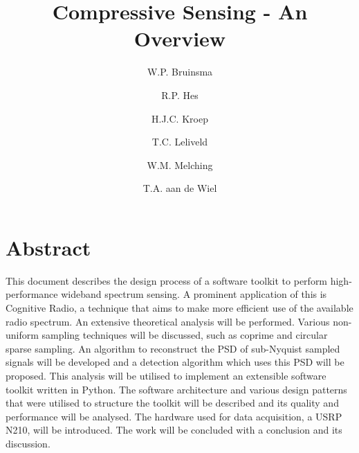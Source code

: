 \documentclass[a4paper, openany, oneside]{memoir}
\title{Compressive Sensing - An Overview}
\author{W.P. Bruinsma \and R.P. Hes \and H.J.C. Kroep \and T.C. Leliveld \and W.M. Melching \and T.A. aan de Wiel}
\begin{document}
\section*{Abstract}
This document describes the design process of a software toolkit to perform high-performance wideband spectrum sensing. A prominent application of this is Cognitive Radio, a technique that aims to make more efficient use of the available radio spectrum. An extensive theoretical analysis will be performed. Various non-uniform sampling techniques will be discussed, such as coprime and circular sparse sampling. An algorithm to reconstruct the PSD of sub-Nyquist sampled signals will be developed and a detection algorithm which uses this PSD will be proposed. This analysis will be utilised to implement an extensible software toolkit written in Python. The software architecture and various design patterns that were utilised to structure the toolkit will be described and its quality and performance will be analysed. The hardware used for data acquisition, a USRP N210, will be introduced. The work will be concluded with a conclusion and its discussion.
\end{document}
